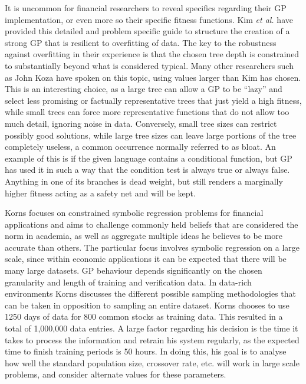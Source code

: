 \documentclass[12pt, letterpaper]{article}
\begin{document}
\textrm{ \indent It is uncommon for financial researchers to reveal specifics regarding their GP implementation, or even more so their specific fitness functions. Kim \textit{et al.} \cite{overfitting} have provided this detailed and problem specific guide to structure the creation of a strong GP that is resilient to overfitting of data. The key to the robustness against overfitting in their experience is that the chosen tree depth is constrained to substantially beyond what is considered typical. Many other researchers such as John Koza \cite{treesize} have spoken on this topic, using values larger than Kim has chosen. This is an interesting choice, as a large tree can allow a GP to be ``lazy'' and select less promising or factually representative trees that just yield a high fitness, while small trees can force more representative functions that do not allow too much detail, ignoring noise in data. Conversely, small tree sizes can restrict possibly good solutions, while large tree sizes can leave large portions of the tree completely useless, a common occurrence normally referred to as bloat. An example of this is if the given language contains a conditional function, but GP has used it in such a way that the condition test is always true or always false. Anything in one of its branches is dead weight, but still renders a marginally higher fitness acting as a safety net and will be kept. }

\textrm{ \indent Korns \cite{korns} focuses on constrained symbolic regression problems for financial applications and aims to challenge commonly held beliefs that are considered the norm in academia, as well as aggregate multiple ideas he believes to be more accurate than others. The particular focus involves symbolic regression on a large scale, since within economic applications it can be expected that there will be many large datasets. GP behaviour depends significantly on the chosen granularity and length of training and verification data. In data-rich environments Korns discusses the different possible sampling methodologies that can be taken in opposition to sampling an entire dataset. Korns chooses to use 1250 days of data for 800 common stocks as training data. This resulted in a total of 1,000,000 data entries. A large factor regarding his decision is the time it takes to process the information and retrain his system regularly, as the expected time to finish training periods is 50 hours. In doing this, his goal is to analyse how well the standard population size, crossover rate, etc. will work in large scale problems, and consider alternate values for these parameters. }
\end{document}
